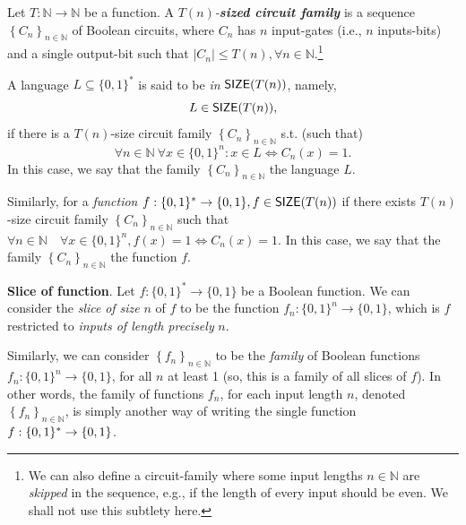 \begin{svgraybox}
\begin{definition}
Let $T:\mathbb{N}\rightarrow \mathbb{N}$ be a function. 
A \emph{$T(n)$-\textbf{sized circuit family}} is a sequence $\left\{C_n\right\}_{n \in \mathbb{N}}$ of Boolean circuits, where $C_n$ has $n$ input-gates (i.e., $n$ inputs-bits) and a single output-bit such that  $\left|C_n\right| \leq T(n), \forall n \in \mathbb{N}$.\footnote{We can also define a circuit-family where some input lengths $n\in\mathbb{N}$ are \emph{skipped} in the sequence, e.g., if the length of every input should be even. We shall not use this subtlety here.}
\end{definition}
\end{svgraybox}

A language $L\subseteq\{0,1\}^*$ is said to be \emph{in} $\operatorname{{\mathsf{SIZE}}} (T(n))$, namely, $$L\in\operatorname{{\mathsf{SIZE}}} (T(n)),$$ if there is a $T(n)$-size circuit family $\left\{C_n\right\}_{n \in \mathbb{N}}$ s.t. (such that) 
$$\forall n \in \mathbb{N~} \forall x \in\{0,1\}^n: x \in L \Leftrightarrow C_n(x)=1.$$
In this case, we say that 
the family $\left\{C_n\right\}_{n \in \mathbb{N}}$  the language $L$.


Similarly, for a \emph{function} $f:\{0,1\}^* \rightarrow\{0,1\}, f \in \operatorname{{\mathsf{SIZE}}}(T(n))$ if there exists $ T(n)$-size circuit family $\left\{C_n\right\}_{n \in \mathbb{N}}$ such that  $\forall n \in \mathbb{N} \quad \forall x \in\{0,1\}^n, f(x)=1 \Leftrightarrow C_n(x)=1$.
In this case, we say that 
the family $\left\{C_n\right\}_{n \in \mathbb{N}}$  the function $f$.



\begin{svgraybox}
\textbf{Slice of function}. 
 Let $f:\{0,1\}^*\to\{0,1\}$ be a Boolean function.
We can consider the \emph{slice} \emph{of size} $n$ of $f$ to be the function $f_n:\{0,1\}^n\to\{0,1\}$, which is $f$ restricted to \emph{inputs of length precisely} $n$. 
\end{svgraybox}

Similarly, we can consider $\left\{f_{n}\right\}_{n\in\mathbb{N}}$ to be the \textit{family} of Boolean functions $f_n:\{0,1\}^n\to \{0,1\}$, 
for all $n$ at least 1 (so, this is a family of all slices of $f$). In other words, the family of functions $f_n$, for each input length $n$, denoted  $\left\{f_{n}\right\}_{n\in\mathbb{N}}$, is simply another way of writing the single function $f:\{0,1\}^*\to\{0,1\}$. 





